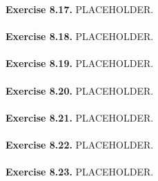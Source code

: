 \documentclass{article}
\begin{document}



\textbf{Exercise 8.17.}
PLACEHOLDER. \\\\






\textbf{Exercise 8.18.}
PLACEHOLDER. \\\\






\textbf{Exercise 8.19.}
PLACEHOLDER. \\\\






\textbf{Exercise 8.20.}
PLACEHOLDER. \\\\






\textbf{Exercise 8.21.}
PLACEHOLDER. \\\\






\textbf{Exercise 8.22.}
PLACEHOLDER. \\\\






\textbf{Exercise 8.23.}
PLACEHOLDER. \\\\



\end{document}
